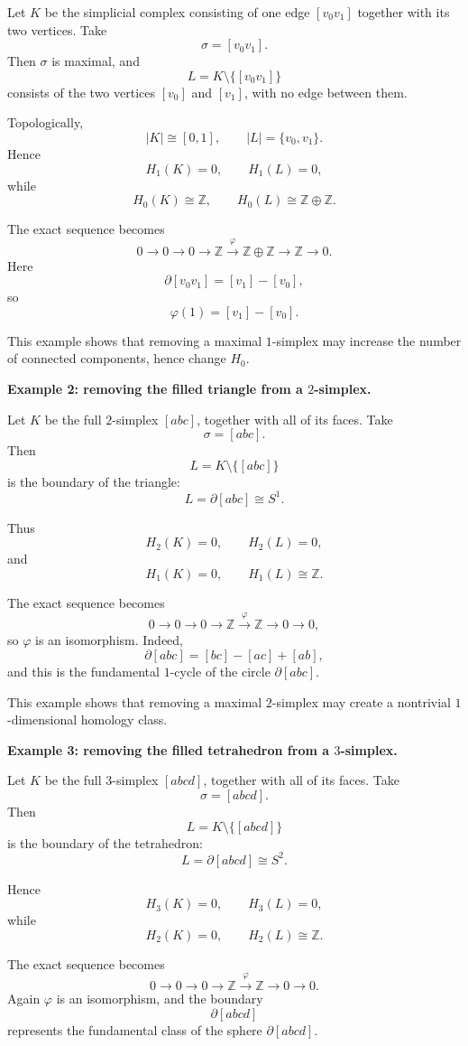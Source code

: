 \documentclass[12pt,a4paper]{article}
\theoremstyle{notespace}
\begin{document}
Let \(K\) be the simplicial complex consisting of one edge \([v_0v_1]\) together with its two vertices. Take
\[
\sigma=[v_0v_1].
\]
Then \(\sigma\) is maximal, and
\[
L=K\setminus\{[v_0v_1]\}
\]
consists of the two vertices \([v_0]\) and \([v_1]\), with no edge between them.

Topologically,
\[
|K|\cong [0,1],
\qquad
|L|=\{v_0,v_1\}.
\]
Hence
\[
H_1(K)=0,\qquad H_1(L)=0,
\]
while
\[
H_0(K)\cong \mathbb Z,
\qquad
H_0(L)\cong \mathbb Z\oplus \mathbb Z.
\]

The exact sequence becomes
\[
0\to 0\to 0\to \mathbb Z
\xrightarrow{\varphi}
\mathbb Z\oplus \mathbb Z
\to \mathbb Z\to 0.
\]
Here
\[
\partial[v_0v_1]=[v_1]-[v_0],
\]
so
\[
\varphi(1)=[v_1]-[v_0].
\]

This example shows that removing a maximal \(1\)-simplex may increase the number of connected components, hence change \(H_0\).

\medskip

\textbf{Example 2: removing the filled triangle from a \(2\)-simplex.}

Let \(K\) be the full \(2\)-simplex \([abc]\), together with all of its faces. Take
\[
\sigma=[abc].
\]
Then
\[
L=K\setminus\{[abc]\}
\]
is the boundary of the triangle:
\[
L=\partial[abc]\cong S^1.
\]

Thus
\[
H_2(K)=0,\qquad H_2(L)=0,
\]
and
\[
H_1(K)=0,\qquad H_1(L)\cong \mathbb Z.
\]

The exact sequence becomes
\[
0\to 0\to 0\to \mathbb Z
\xrightarrow{\varphi}
\mathbb Z
\to 0\to 0,
\]
so \(\varphi\) is an isomorphism. Indeed,
\[
\partial[abc]=[bc]-[ac]+[ab],
\]
and this is the fundamental \(1\)-cycle of the circle \(\partial[abc]\).

This example shows that removing a maximal \(2\)-simplex may create a nontrivial \(1\)-dimensional homology class.

\medskip

\textbf{Example 3: removing the filled tetrahedron from a \(3\)-simplex.}

Let \(K\) be the full \(3\)-simplex \([abcd]\), together with all of its faces. Take
\[
\sigma=[abcd].
\]
Then
\[
L=K\setminus\{[abcd]\}
\]
is the boundary of the tetrahedron:
\[
L=\partial[abcd]\cong S^2.
\]

Hence
\[
H_3(K)=0,\qquad H_3(L)=0,
\]
while
\[
H_2(K)=0,\qquad H_2(L)\cong \mathbb Z.
\]

The exact sequence becomes
\[
0\to 0\to 0\to \mathbb Z
\xrightarrow{\varphi}
\mathbb Z
\to 0\to 0.
\]
Again \(\varphi\) is an isomorphism, and the boundary
\[
\partial[abcd]
\]
represents the fundamental class of the sphere \(\partial[abcd]\).
\end{document}
